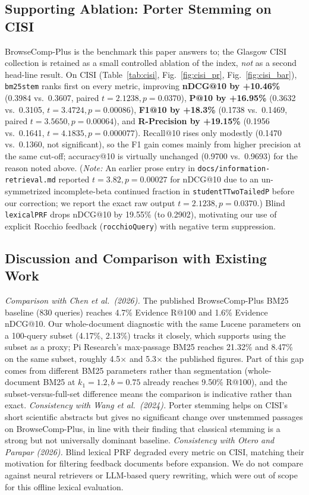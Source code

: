 \documentclass[conference]{IEEEtran}
\begin{document}
\subsection{Supporting Ablation: Porter Stemming on CISI}
BrowseComp-Plus is the benchmark this paper answers to; the Glasgow CISI collection is retained as a small controlled ablation of the index, \emph{not} as a second head-line result. On CISI (Table~\ref{tab:cisi}, Fig.~\ref{fig:cisi_pr}, Fig.~\ref{fig:cisi_bar}), \texttt{bm25stem} ranks first on every metric, improving \textbf{nDCG@10 by +10.46\%} (0.3984 vs.\ 0.3607, paired $t = 2.1238, p = 0.0370$), \textbf{P@10 by +16.95\%} (0.3632 vs.\ 0.3105, $t = 3.4724, p = 0.00086$), \textbf{F1@10 by +18.3\%} (0.1738 vs.\ 0.1469, paired $t = 3.5650, p = 0.00064$), and \textbf{R-Precision by +19.15\%} (0.1956 vs.\ 0.1641, $t = 4.1835, p = 0.000077$). Recall@10 rises only modestly (0.1470 vs.\ 0.1360, not significant), so the F1 gain comes mainly from higher precision at the same cut-off; accuracy@10 is virtually unchanged (0.9700 vs.\ 0.9693) for the reason noted above. (\textit{Note:} An earlier prose entry in \texttt{docs/information-retrieval.md} reported $t = 3.82, p = 0.00027$ for nDCG@10 due to an un-symmetrized incomplete-beta continued fraction in \texttt{studentTTwoTailedP} before our correction; we report the exact raw output $t = 2.1238, p = 0.0370$.) Blind \texttt{lexicalPRF} drops nDCG@10 by 19.55\% (to 0.2902), motivating our use of explicit Rocchio feedback (\texttt{rocchioQuery}) with negative term suppression.

\subsection{Discussion and Comparison with Existing Work}
\textit{Comparison with Chen et al.\ (2026).} The published BrowseComp-Plus BM25 baseline (830 queries) reaches 4.7\% Evidence R@100 and 1.6\% Evidence nDCG@10. Our whole-document diagnostic with the same Lucene parameters on a 100-query subset (4.17\%, 2.13\%) tracks it closely, which supports using the subset as a proxy; Pi Research's max-passage BM25 reaches 21.32\% and 8.47\% on the same subset, roughly 4.5$\times$ and 5.3$\times$ the published figures. Part of this gap comes from different BM25 parameters rather than segmentation (whole-document BM25 at $k_1=1.2, b=0.75$ already reaches 9.50\% R@100), and the subset-versus-full-set difference means the comparison is indicative rather than exact. \textit{Consistency with Wang et al.\ (2024).} Porter stemming helps on CISI's short scientific abstracts but gives no significant change over unstemmed passages on BrowseComp-Plus, in line with their finding that classical stemming is a strong but not universally dominant baseline. \textit{Consistency with Otero and Parapar (2026).} Blind lexical PRF degraded every metric on CISI, matching their motivation for filtering feedback documents before expansion. We do not compare against neural retrievers or LLM-based query rewriting, which were out of scope for this offline lexical evaluation.
\end{document}
